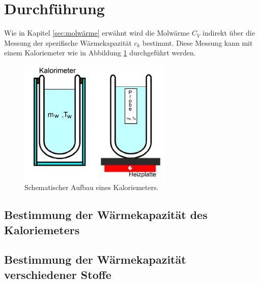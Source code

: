 \section{Durchführung}
\label{sec:Durchführung}

Wie in Kapitel \ref{sec:molwärme} erwähnt wird die Molwärme $C_V$ indirekt über die Messung der spezifische Wärmekapazität $c_k$ bestimmt.
Diese Messung kann mit einem Kaloriemeter wie in Abbildung \ref{fig:abb1} durchgeführt werden.
\begin{figure}
\centering
\includegraphics[height=6.0cm]{data/abb1.png}
\caption{Schematischer Aufbau eines Kaloriemeters.}
\label{fig:abb1}
\end{figure}

\subsection{Bestimmung der Wärmekapazität des Kaloriemeters}
\label{sec:Durchführung_Kalo}



\subsection{Bestimmung der Wärmekapazität verschiedener Stoffe}
\label{sec:Durchführung_Stoffe}
